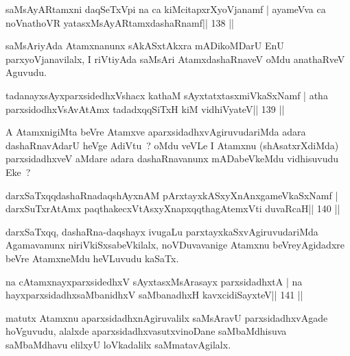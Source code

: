 
\begin{shl}
saMsAyARtamxni daqSeTxV\s pi na ca kiMcitapxrXyoVjanamf |
ayameVva ca noV\s nathoVR yatasxMsAyARtamxdashaRnamf\hfill || 138 ||
\end{shl}

\begin{artha}
saMsAriyAda Atamxnanunx sAkASxtAkxra mADikoMDarU EnU parxyoVjanavilalx, I riVtiyAda saMsAri AtamxdashaRnaveV oMdu anathaRveV Aguvudu.
\end{artha}


\begin{shl}
tadanayxsAyxparxsidedhxVshacx kathaM sAyxtatxtasxmiVkaSxNamf |
atha parxsidodhxV\s sAvAtAmx tadadxqqSiTxH kiM vidhiVyateV\hfill || 139 ||
\end{shl}

\begin{artha}
A AtamxnigiMta beVre Atamxve aparxsidadhxvAgiruvudariMda adara dashaRnavAdarU heVge AdiVtu~? oMdu veVLe I Atamxnu (shAsatxrXdiMda) parxsidadhxveV aMdare adara dashaRnavanunx mADabeVkeMdu vidhisuvudu Eke~? 
\end{artha}


\begin{shl}
darxSaTxqqdashaRnadaqshAyxnAM pArxtayxkASxyXnAnx\s\s gameVkaSxNamf |
darxSuTxrAtAmx paqthakecxVtAsxyXnapxqqthagAtemxVti duvaRcaH\hfill || 140 ||
\end{shl}

\begin{artha}
darxSaTxqq, dashaRna-daqshayx ivugaLu parxtayxkaSxvAgiruvudariMda Agamavanunx niriVkiSxsabeVkilalx, noVDuvavanige Atamxnu beVreyAgidadxre beVre AtamxneMdu heVLuvudu kaSaTx.
\end{artha}

\begin{shl}
na cA\s\s tamxnayxparxsidedhxV sAyxtasxMsArasayx parxsidadhxtA |
na hayxparxsidadhxsaMbanidhxV saMbanadhxH kavxcidiSayxteV\hfill || 141 ||
\end{shl}

\begin{artha}
matutx Atamxnu aparxsidadhxnAgiruvalilx saMsAravU parxsidadhxvAgade hoVguvudu, alalxde aparxsidadhxvasutxvinoDane saMbaMdhisuva saMbaMdhavu elilxyU loVkadalilx saMmatavAgilalx.
\end{artha}

